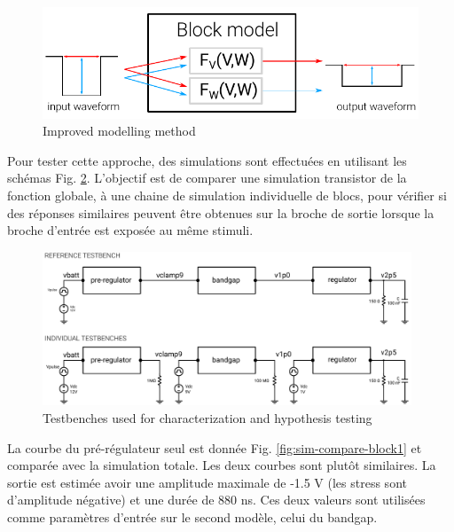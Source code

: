 \begin{figure}[!h]
  \centering
  \includegraphics{src/1/figures/principle_transfert_function_v2.pdf}
  \caption{Improved modelling method}
  \label{fig:principle-transfert-func-v2}
\end{figure}

Pour tester cette approche, des simulations sont effectuées en utilisant les schémas Fig. \ref{fig:hypothesis-setup}.
L'objectif est de comparer une simulation transistor de la fonction globale, à une chaine de simulation individuelle de blocs, pour vérifier si des réponses similaires peuvent être obtenues sur la broche de sortie lorsque la broche d'entrée est exposée au même stimuli.

\begin{figure}[!h]
  \centering
  \includegraphics[width=0.98\textwidth]{src/1/figures/hypothesis_testing_setup.pdf}
  \caption{Testbenches used for characterization and hypothesis testing}
  \label{fig:hypothesis-setup}
\end{figure}

La courbe du pré-régulateur seul est donnée Fig. \ref{fig:sim-compare-block1} et comparée avec la simulation totale.
Les deux courbes sont plutôt similaires.
La sortie est estimée avoir une amplitude maximale de -1.5 V (les stress sont d'amplitude négative) et une durée de 880 ns.
Ces deux valeurs sont utilisées comme paramètres d'entrée sur le second modèle, celui du bandgap.

